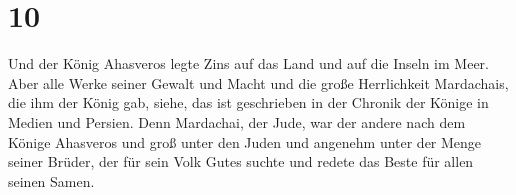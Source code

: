 \hypertarget{section-9}{%
\section{10}\label{section-9}}

 Und der König Ahasveros legte Zins auf das Land und auf die
Inseln im Meer.  Aber alle Werke seiner Gewalt und Macht und
die große Herrlichkeit Mardachais, die ihm der König gab, siehe, das ist
geschrieben in der Chronik der Könige in Medien und Persien.
 Denn Mardachai, der Jude, war der andere nach dem Könige
Ahasveros und groß unter den Juden und angenehm unter der Menge seiner
Brüder, der für sein Volk Gutes suchte und redete das Beste für allen
seinen Samen.
